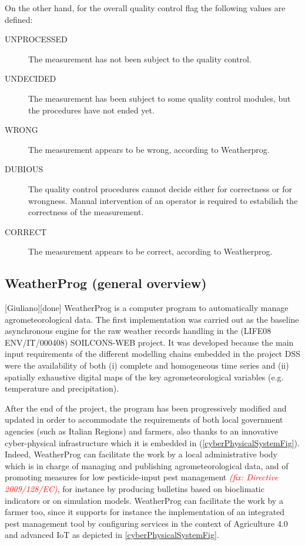 \documentclass[authoryear,preprint,review,12pt]{elsarticle}
\newcommand{\note}[1]{\emph{\textcolor{red}{#1}}}
\begin{document}
On the other hand, for the overall quality control flag the following values are defined: 
\begin{description}
	\item[UNPROCESSED] The measurement has not been subject to the quality control.
	\item[UNDECIDED] The measurement has been subject to some quality control modules, but the procedures have not ended yet.
	\item[WRONG] The measurement appears to be wrong, according to Weatherprog.
	\item[DUBIOUS] The quality control procedures cannot decide either for correctness or for wrongness. Manual intervention of an operator is required to estabilish the correctness of the measurement.
	\item[CORRECT] The measurement appears to be correct, according to Weatherprog.
\end{description} 

\subsection{WeatherProg (general overview)}[Giuliano][done]
WeatherProg \citep{langella:weatherprog2014} is a computer program to automatically manage agrometeorological data.
The first implementation was carried out as the baseline asynchronous engine for the raw weather records handling in the (LIFE08 ENV/IT/000408) SOILCONS-WEB project.
It was developed because the main input requirements of the different modelling chains embedded in the project DSS \citep{Terribile:soilconsweb:2015} were the availability of both (i) complete and homogeneous time series and (ii) spatially exhaustive digital maps of the key agrometeorological variables (e.g. temperature and precipitation).

After the end of the project, the program has been progressively modified and updated in order to accommodate the requirements of both local government agencies (such as Italian Regions) and farmers, also thanks to an innovative cyber-physical infrastructure which it is embedded in (\cref{cyberPhysicalSystemFig}).
Indeed, WeatherProg can facilitate the work by a local administrative body which is in charge of managing and publishing agrometeorological data, and of promoting measures for low pesticide-input pest management \note{(fix: Directive 2009/128/EC)\citep{eu:dir128:2009}}, for instance by producing bulletins based on bioclimatic indicators or on simulation models.
WeatherProg can facilitate the work by a farmer too, since it supports for instance the implementation of an integrated pest management tool \citep{Terribile:dssvitis:2017} by configuring services in the context of Agriculture 4.0 and advanced IoT as depicted in \cref{cyberPhysicalSystemFig}.
\end{document}
